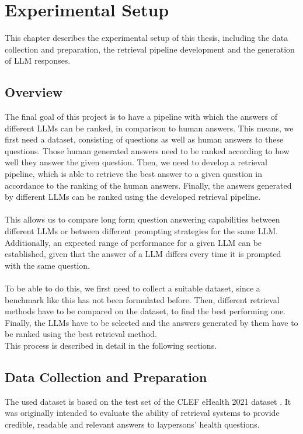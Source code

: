 \chapter{Experimental Setup}
This chapter describes the experimental setup of this thesis, including the data collection and preparation, the retrieval pipeline development and the generation of LLM responses.

\section{Overview}\label{sec:overview}
The final goal of this project is to have a pipeline with which the answers of different LLMs can be ranked, in comparison to human answers.
This means, we first need a dataset, consisting of questions as well as human answers to these questions.
Those human generated answers need to be ranked according to how well they answer the given question.
Then, we need to develop a retrieval pipeline, which is able to retrieve the best answer to a given question in accordance to the ranking of the human answers.
Finally, the answers generated by different LLMs can be ranked using the developed retrieval pipeline.
\\\\
This allows us to compare long form question answering capabilities between different LLMs or between different prompting strategies for the same LLM.
Additionally, an expected range of performance for a given LLM can be established, given that the answer of a LLM differs every time it is prompted with the same question.
\\\\
To be able to do this, we first need to collect a suitable dataset, since a benchmark like this has not been formulated before.
Then, different retrieval methods have to be compared on the dataset, to find the best performing one.
Finally, the LLMs have to be selected and the answers generated by them have to be ranked using the best retrieval method.
\\
This process is described in detail in the following sections.

\section{Data Collection and Preparation}
The used dataset is based on the test set of the CLEF eHealth 2021 dataset \cite{goeuriot:2021}.
It was originally intended to evaluate the ability of retrieval systems to provide credible, readable and relevant answers to laypersons' health questions.

